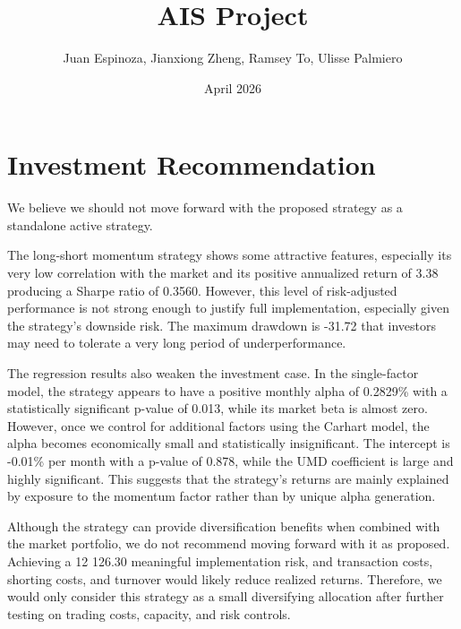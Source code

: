 \documentclass[12pt]{article}
\title{AIS Project}
\author{Juan Espinoza, Jianxiong Zheng, Ramsey To, Ulisse Palmiero}
\date{April 2026}
\begin{document}
\maketitle

\section{Investment Recommendation}

We believe we should not move forward with the proposed strategy as a standalone active strategy.

The long-short momentum strategy shows some attractive features, especially its very low correlation
with the market and its positive annualized return of 3.38%
producing a Sharpe ratio of 0.3560. However, this level of risk-adjusted performance is not strong
enough to justify full implementation, especially given the strategy’s downside risk. The maximum
drawdown is -31.72%
that investors may need to tolerate a very long period of underperformance.

The regression results also weaken the investment case. In the single-factor model, the strategy appears
to have a positive monthly alpha of 0.2829\% with a statistically significant p-value of 0.013, while its
market beta is almost zero. However, once we control for additional factors using the Carhart model,
the alpha becomes economically small and statistically insignificant. The intercept is -0.01\% per
month with a p-value of 0.878, while the UMD coefficient is large and highly significant. This suggests
that the strategy’s returns are mainly explained by exposure to the momentum factor rather than by
unique alpha generation.

Although the strategy can provide diversification benefits when combined with the market portfolio, we
do not recommend moving forward with it as proposed. Achieving a 12%
126.30%
meaningful implementation risk, and transaction costs, shorting costs, and turnover would likely reduce
realized returns. Therefore, we would only consider this strategy as a small diversifying allocation after
further testing on trading costs, capacity, and risk controls.


\end{document}
